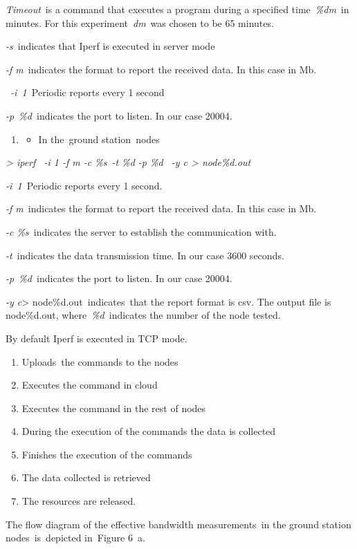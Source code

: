 \documentclass[a4paper]{article}
\newcounter{saveenum}
\newcommand\liststyleLFOviii{%
\renewcommand\theenumi{\arabic{enumi}}
\renewcommand\theenumii{\roman{enumii}}
\renewcommand\theenumiii{\arabic{enumiii}}
\renewcommand\labelenumi{\theenumi.}
\renewcommand\labelitemi{o}
\renewcommand\labelenumii{\theenumii.}
\renewcommand\labelenumiii{\theenumiii.}
}
\begin{document}
\textit{Timeout}\ is a command that executes a program during a
specified time\ \textit{\%dm}\ in minutes. For this
experiment\ \textit{dm}\ was chosen to be 65 minutes.

\textit{{}-s}\ indicates that Iperf is executed in server mode

\textit{{}-f m}\ indicates the format to report the received data. In
this case in Mb. \ 

\ \textit{{}-i}\textit{\ 1\ }Periodic reports every 1 second

\textit{{}-p}\textit{\ }\textit{\%d}\textit{\ }indicates the port to
listen. In our case 20004.


\bigskip

\liststyleLFOviii
\setcounter{saveenum}{\value{enumi}}
\begin{enumerate}
\setcounter{enumi}{\value{saveenum}}
\item \begin{itemize}
\item In the\ ground station\ nodes
\end{itemize}
\end{enumerate}
{\itshape
{\textgreater} iperf \ {}-i 1 -f m -c \%s\ {}-t \%d -p \%d \ {}-y c
{\textgreater} node\%d.out\ }

\textit{{}-i}\textit{\ 1\ }Periodic reports every 1 second.

\textit{{}-f m}\ indicates the format to report the received data. In
this case in Mb.

\textit{{}-c \%s\ }indicates the server to establish the communication
with.

\textit{{}-t\ }indicates the data transmission time. In our case 3600
seconds.

\textit{{}-}\textit{p}\textit{\ }\textit{\%d}\textit{\ }indicates the
port to listen. In our case 20004.

\textit{{}-y c}{\textgreater} node\%d.out\textit{\ }indicates\ that the
report format is csv. The output file is node\%d.out,
where\ \textit{\%d}\ indicates the number of the node tested.

By default Iperf is executed in TCP mode.

\liststyleLFOviii
\setcounter{saveenum}{\value{enumi}}
\begin{enumerate}
\setcounter{enumi}{\value{saveenum}}
\item Uploads\ the commands to the nodes
\item Executes the command in cloud
\item Executes the command in the rest of nodes
\item During the execution of the commands the data is collected
\item Finishes the execution of the commands\ 
\item The data collected is retrieved\ 
\item The resources are released.
\end{enumerate}
The flow diagram of the effective bandwidth measurements\ in the ground
station nodes\ is\ depicted in\ Figure 6\ a.
\end{document}
